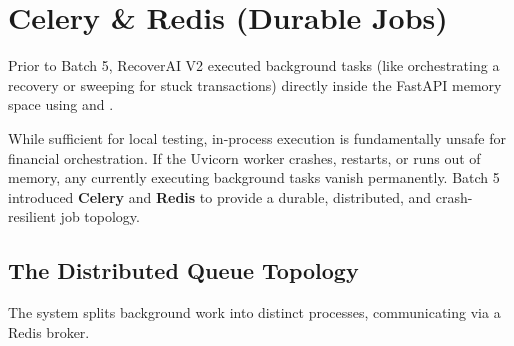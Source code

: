 
\section{Celery \& Redis (Durable Jobs)}

\begin{tcolorbox}[summarybox={\iconFlow[1.5] Moving Beyond In-Process Execution}]
\color{textdark}
Prior to Batch 5, RecoverAI V2 executed background tasks (like orchestrating a recovery or sweeping for stuck transactions) directly inside the FastAPI memory space using  and .

While sufficient for local testing, in-process execution is fundamentally unsafe for financial orchestration. If the Uvicorn worker crashes, restarts, or runs out of memory, any currently executing background tasks vanish permanently. Batch 5 introduced \textbf{Celery} and \textbf{Redis} to provide a durable, distributed, and crash-resilient job topology.
\end{tcolorbox}

\vspace{0.8cm}

\subsection{The Distributed Queue Topology}

The system splits background work into distinct processes, communicating via a Redis broker.

